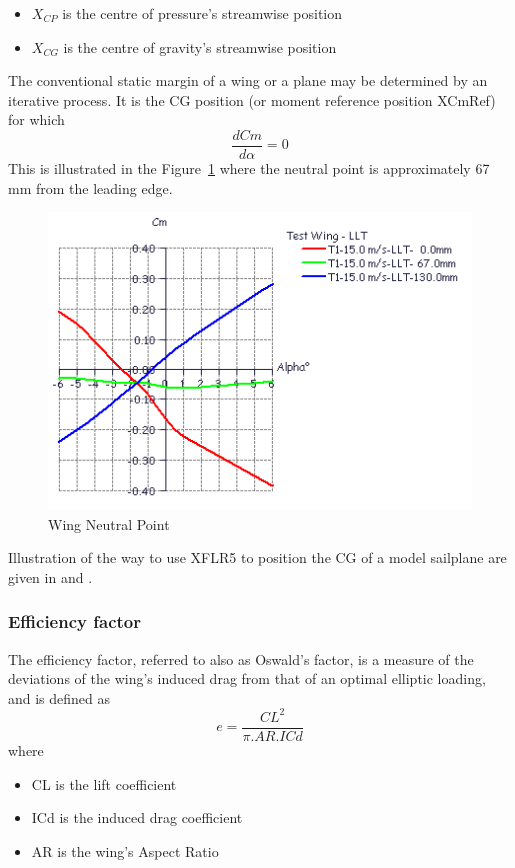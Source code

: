 \documentclass[a4paper,twoside,12pt,dvips]{article}
\begin{document}
\begin{itemize}
\item $X_{CP}$ is the centre of pressure's streamwise position
\item $X_{CG}$ is the centre of gravity's streamwise position
\end{itemize}

The conventional static margin of a wing or a plane may be determined
by an iterative process. It is the CG position (or moment reference
position XCmRef) for which \[\frac{dCm}{d\alpha}=0\] This is
illustrated in the Figure~\ref{fig:wing_neutral_point} where the
neutral point is approximately 67 mm from the leading edge.

\begin{figure}[htbp]
  \includegraphics[width=0.8\linewidth]{img-33}\centering 
  \caption{Wing Neutral Point}
  \label{fig:wing_neutral_point}
\end{figure}

Illustration of the way to use XFLR5 to position the CG of a model
sailplane are given in \cite{DeperroisStab} and \cite{DeperroisNotions}.

\subsubsection{Efficiency factor}

The efficiency factor, referred to also as Oswald's factor, is a
measure of the deviations of the wing's induced drag from that of an
optimal elliptic loading, and is defined
as \[e=\frac{CL^2}{\pi.AR.ICd}\] where

\begin{itemize}
\item CL is the lift coefficient
\item ICd is the induced drag coefficient
\item AR is the wing's Aspect Ratio
\end{itemize}
\end{document}
